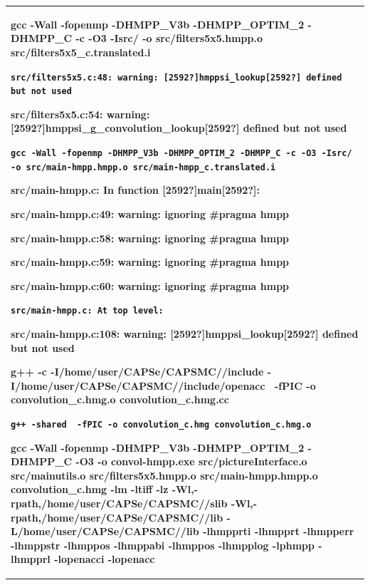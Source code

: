 \documentclass[a4paper]{article}
\begin{document}
\begin{flushleft}
\begin{tiny}
\begin{supertabular}{|m{6.15046in}|}
{\ttfamily\bfseries gcc -Wall -fopenmp
-DHMPP\_V3b -DHMPP\_OPTIM\_2 -DHMPP\_C -c -O3 -Isrc/ -o
src/filters5x5.hmpp.o src/filters5x5\_c.translated.i}

{ \texttt{\textbf{src/filters5x5.c:48: warning:
[2592?]hmppsi\_lookup[2592?] defined but not used}}}

{\ttfamily\bfseries src/filters5x5.c:54:
warning: [2592?]hmppsi\_g\_convolution\_lookup[2592?] defined but not
used}

{ \texttt{\textbf{gcc -Wall -fopenmp -DHMPP\_V3b
-DHMPP\_OPTIM\_2 -DHMPP\_C -c -O3 -Isrc/ -o src/main-hmpp.hmpp.o
src/main-hmpp\_c.translated.i}}}

{\ttfamily\bfseries src/main-hmpp.c: In function
[2592?]main[2592?]:}

{\ttfamily\bfseries src/main-hmpp.c:49: warning:
ignoring \#pragma hmpp}

{\ttfamily\bfseries src/main-hmpp.c:58: warning:
ignoring \#pragma hmpp}

{\ttfamily\bfseries src/main-hmpp.c:59: warning:
ignoring \#pragma hmpp}

{\ttfamily\bfseries src/main-hmpp.c:60: warning:
ignoring \#pragma hmpp}

{ \texttt{\textbf{src/main-hmpp.c: At top
level:}}}

{\ttfamily\bfseries src/main-hmpp.c:108:
warning: [2592?]hmppsi\_lookup[2592?] defined but not used}

{\ttfamily\bfseries g++ -c
-I/home/user/CAPSe/CAPSMC//include
-I/home/user/CAPSe/CAPSMC//include/openacc \ {}-fPIC -o
convolution\_c.hmg.o convolution\_c.hmg.cc}

{ \texttt{\textbf{g++ -shared \ {}-fPIC -o
convolution\_c.hmg convolution\_c.hmg.o}}}

{\ttfamily\bfseries gcc -Wall -fopenmp
-DHMPP\_V3b -DHMPP\_OPTIM\_2 -DHMPP\_C -O3 -o convol-hmpp.exe
src/pictureInterface.o src/mainutils.o src/filters5x5.hmpp.o
src/main-hmpp.hmpp.o convolution\_c.hmg -lm -ltiff -lz
-Wl,-rpath,/home/user/CAPSe/CAPSMC//slib
-Wl,-rpath,/home/user/CAPSe/CAPSMC//lib -L/home/user/CAPSe/CAPSMC//lib
-lhmpprti -lhmpprt -lhmpperr -lhmppstr -lhmppos -lhmppabi -lhmppos
-lhmpplog -lphmpp -lhmpprl -lopenacci -lopenacc}


\end{supertabular}
\end{tiny}
\end{flushleft}
\end{document}
